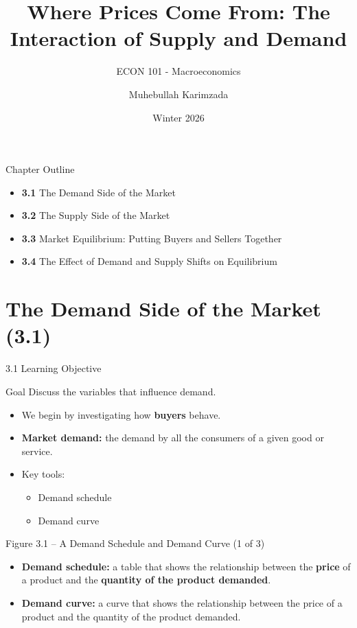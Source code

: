 \documentclass[aspectratio=169]{beamer}
\title{\textbf{Where Prices Come From: The Interaction of Supply and Demand \vspace{.5cm}\\  }}
\subtitle{ {\large ECON 101 - Macroeconomics}}
\author{Muhebullah Karimzada}
\date{Winter 2026}
\begin{document}
\begin{frame}[plain]
  \titlepage
\end{frame}

\begin{frame}{Chapter Outline}
\transfade
\begin{itemize}
  \item \textbf{3.1} The Demand Side of the Market
  \item \textbf{3.2} The Supply Side of the Market
  \item \textbf{3.3} Market Equilibrium: Putting Buyers and Sellers Together
  \item \textbf{3.4} The Effect of Demand and Supply Shifts on Equilibrium
\end{itemize}
\end{frame}

\section{The Demand Side of the Market (3.1)}

\begin{frame}{3.1 Learning Objective}
\transfade
\begin{block}{Goal}
Discuss the variables that influence demand.
\end{block}
\begin{itemize}
  \item We begin by investigating how \textbf{buyers} behave.
  \item \textbf{Market demand:} the demand by all the consumers of a given good or service.
  \item Key tools:
  \begin{itemize}
    \item Demand schedule
    \item Demand curve
  \end{itemize}
\end{itemize}
\end{frame}

\begin{frame}{Figure 3.1 -- A Demand Schedule and Demand Curve (1 of 3)}
\transfade
\begin{itemize}
  \item \textbf{Demand schedule:} a table that shows the relationship between the \textbf{price} of a product and the \textbf{quantity of the product demanded}.
  \item \textbf{Demand curve:} a curve that shows the relationship between the price of a product and the quantity of the product demanded.
\end{itemize}
\end{frame}
\end{document}
